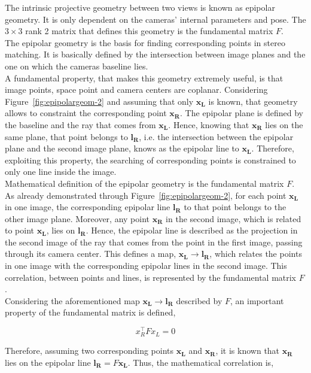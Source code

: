 The intrinsic projective geometry between two views is known as epipolar geometry.
It is only dependent on the cameras' internal parameters and pose.
The $3 \times 3$ rank 2 matrix that defines this geometry is the fundamental matrix $F$.\\
The epipolar geometry is the basis for finding corresponding points in stereo matching. 
It is basically defined by the intersection between image planes and the one on which the cameras baseline lies.\\
A fundamental property, that makes this geometry extremely useful, is that image points, space point and camera centers are coplanar. 
Considering Figure~\ref{fig:epipolargeom-2} and assuming that only $\mathbf{x_L}$ is known, that geometry allows to constraint the corresponding point $\mathbf{x_R}$. 
The epipolar plane is defined by the baseline and the ray that comes from $\mathbf{x_L}$. 
Hence, knowing that $\mathbf{x_R}$ lies on the same plane, that point belongs to $\mathbf{l_R}$, i.e. the intersection between the epipolar plane and the second image plane, knows as the epipolar line to $\mathbf{x_L}$.
Therefore, exploiting this property, the searching of corresponding points is constrained to only one line inside the image.\\
Mathematical definition of the epipolar geometry is the fundamental matrix $F$.
As already demonstrated through Figure~\ref{fig:epipolargeom-2}, for each point $\mathbf{x_L}$ in one image, the corresponding epipolar line $\mathbf{l_R}$ to that point belongs to the other image plane. 
Moreover, any point $\mathbf{x_R}$ in the second image, which is related to point $\mathbf{x_L}$, lies on $\mathbf{l_R}$.
Hence, the epipolar line is described as the projection in the second image of the ray that comes from the point in the first image, passing through its camera center.
This defines a map, $\mathbf{x_L} \rightarrow \mathbf{l_R}$, which relates the points in one image with the corresponding epipolar lines in the second image.
This correlation, between points and lines, is represented by the fundamental matrix $F$.\\
Considering the aforementioned map $\mathbf{x_L} \rightarrow \mathbf{l_R}$ described by $F$, an important property of the fundamental matrix is defined,

\begin{equation}
\label{eqn:fundmatprop}
	x_R^\top F x_L = 0
\end{equation}

Therefore, assuming two corresponding points $\mathbf{x_L}$ and $\mathbf{x_R}$, it is known that $\mathbf{x_R}$ lies on the epipolar line $\mathbf{l_R} = F \mathbf{x_L}$. 
Thus, the mathematical correlation is,

